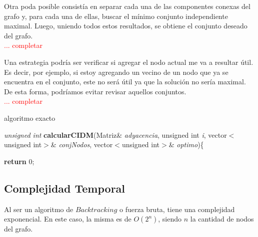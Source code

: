 Otra poda posible consist\'ia en separar cada una de las componentes conexas del grafo y, para cada una de ellas, buscar el m\'inimo conjunto independiente maximal.
Luego, uniendo todos estos resultados, se obtiene el conjunto deseado del grafo.\\
\textcolor{red}{... completar}

Una estrategia podr\'ia ser verificar si agregar el nodo actual me va a resultar \'util. Es decir, por ejemplo, si estoy agregando un vecino de un nodo que ya se encuentra en el conjunto, este no ser\'a \'util ya que
la soluci\'on no ser\'ia maximal. De esta forma, podr\'iamos evitar revisar aquellos conjuntos.\\
\textcolor{red}{... completar}\\

\newpage
\begin{algorithm}[h!]
\caption{algoritmo exacto}

\textit{unsigned int} \textbf{calcularCIDM}(Matriz\& \textit{adyacencia}, unsigned int \textit{i}, vector$<$unsigned int$>$\& \textit{conjNodos}, vector$<$unsigned int$>$\& \textit{optimo})\{ 
\newline

\textbf{return} 0;
\end{algorithm}

\subsection{Complejidad Temporal}
Al ser un algoritmo de $Backtracking$ o fuerza bruta, tiene una complejidad exponencial. En este caso, la misma es de $O(2^n)$, siendo $n$ la cantidad de nodos del grafo. \\

